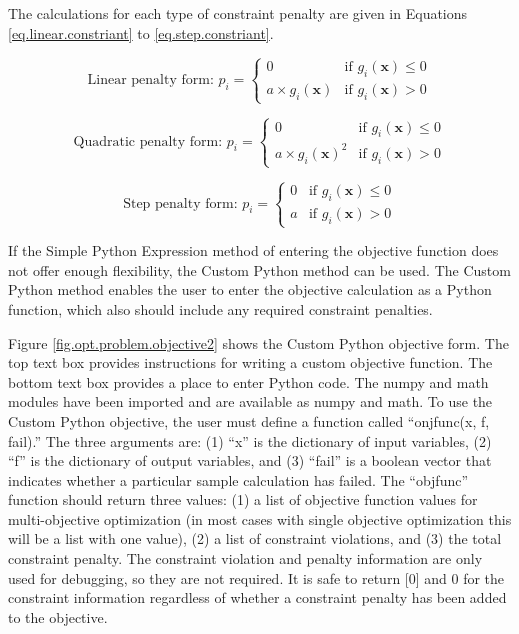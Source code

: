 The calculations for each type of constraint penalty are given in Equations \ref{eq.linear.constriant} to \ref{eq.step.constriant}.

\begin{equation}\label{eq.linear.constriant}
	\text{Linear penalty form:  }p_i = 
	\begin{cases}
		0 & \text{if } g_i(\mathbf{x}) \leq 0\\
		a \times g_i(\mathbf{x}) & \text{if } g_i(\mathbf{x}) > 0
	\end{cases}
\end{equation}

\begin{equation}\label{eq.quadratic.constriant}
\text{Quadratic penalty form:  }p_i = 
\begin{cases}
0 & \text{if } g_i(\mathbf{x}) \leq 0\\
a \times g_i(\mathbf{x})^2 & \text{if } g_i(\mathbf{x}) > 0
\end{cases}
\end{equation}

\begin{equation}\label{eq.step.constriant}
\text{Step penalty form:  }p_i = 
\begin{cases}
0 & \text{if } g_i(\mathbf{x}) \leq 0\\
a & \text{if } g_i(\mathbf{x}) > 0
\end{cases}
\end{equation}

If the Simple Python Expression method of entering the objective function does not offer enough flexibility, the Custom Python method can be used. The Custom Python method enables the user to enter the objective calculation as a Python function, which also should include any required constraint penalties.

Figure \ref{fig.opt.problem.objective2} shows the Custom Python objective form. The top text box provides instructions for writing a custom objective function. The bottom text box provides a place to enter Python code. The numpy and math modules have been imported and are available as numpy and math. To use the Custom Python objective, the user must define a function called ``onjfunc(x, f, fail).''  The three arguments are: (1) ``x'' is the dictionary of input variables, (2) ``f'' is the dictionary of output variables, and (3) ``fail'' is a boolean vector that indicates whether a particular sample calculation has failed. The ``objfunc'' function should return three values: (1) a list of objective function values for multi-objective optimization (in most cases with single objective optimization this will be a list with one value), (2) a list of constraint violations, and (3) the total constraint penalty. The constraint violation and penalty information are only used for debugging, so they are not required. It is safe to return [0] and 0 for the constraint information regardless of whether a constraint penalty has been added to the objective.
 
